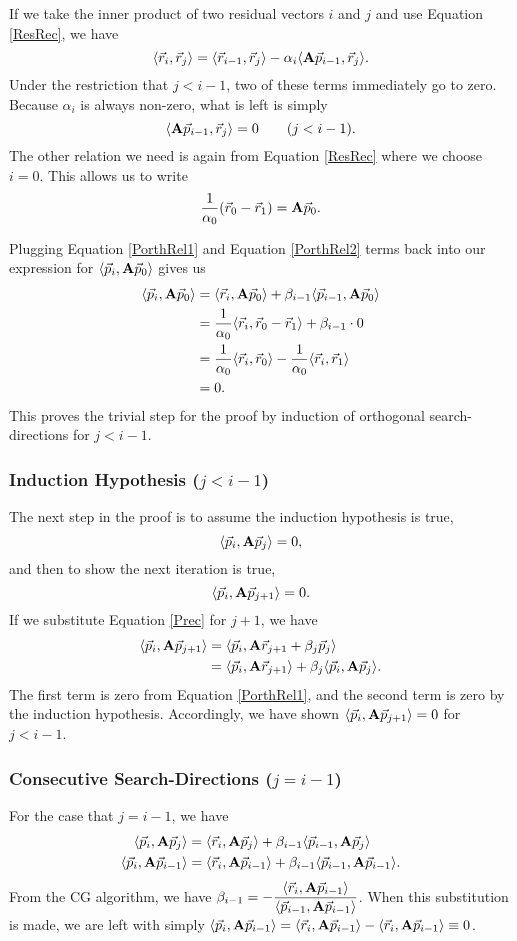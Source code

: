 \documentclass[11pt,letterpaper,oneside,notitlepage]{article}	%
\newcommand{\bfa}{{\bf A}}						%
\newcommand{\ip}[2]{\langle \vec #1,\vec #2 \rangle}	%
\newcommand{\aip}[2]{\langle \vec #1,\bfa\vec #2 \rangle}	%
\newcommand{\eq}[1]{Equation \eqref{#1}}		%
\newcommand{\pindent}[1]{\hspace{6mm}}  		%
\numberwithin{equation}{section}				%
\begin{document}
If we take the inner product of two residual vectors $i$ and $j$ and use \eq{ResRec}, we have 
\[
\ip{r_i}{r_j} = \ip{r_{i-1}}{r_j} -\alpha_i\langle\bfa\vec p_{i-1},\vec r_j\rangle
.\]
Under the restriction that $j<i-1$, two of these terms immediately go to zero. Because $\alpha_i$ is always non-zero, what is left is simply 
\begin{equation}
\langle\bfa\vec p_{i-1},\vec r_j\rangle=0 \qquad (j<i-1) \label{PorthRel1}
.\end{equation}
The other relation we need is again from \eq{ResRec} where we choose $i=0$. This allows us to write
\begin{equation}
\frac{1}{\alpha_0}(\vec r_0-\vec r_1) = \bfa \vec p_0 \label{PorthRel2}
.\end{equation}

Plugging \eq{PorthRel1} and \eq{PorthRel2} terms back into our expression for $\aip{p_i}{p_0}$ gives us
\begin{align*}
\aip{p_i}{p_0} &= \aip{r_i}{p_0} + \beta_{i-1}\aip{p_{i-1}}{p_0} \\
&= \frac{1}{\alpha_0}\ip{r_i}{r_0-\vec r_1} + \beta_{i-1}\cdot 0 \\
&= \frac{1}{\alpha_0}\ip{r_i}{r_0} - \frac{1}{\alpha_0}\ip{r_i}{r_1} \\
&= 0
.\end{align*}
This proves the trivial step for the proof by induction of orthogonal search-directions for $j<i-1$.

\subsubsection{Induction Hypothesis ($j<i-1$)}%
\pindent{}The next step in the proof is to assume the induction hypothesis is true,
\[
\aip{p_i}{p_j}=0
,\]
and then to show the next iteration is true,
\[
\aip{p_i}{p_{j+1}}=0
.\]
If we substitute \eq{Prec} for $j+1$, we have
\begin{align*}
\aip{p_i}{p_{j+1}} &= \aip{p_i}{r_{j+1}+\beta_j\vec p_j} \\
&= \aip{p_i}{r_{j+1}}+\beta_j\aip{p_i}{p_j}
.\end{align*}
The first term is zero from \eq{PorthRel1}, and the second term is zero by the induction hypothesis. Accordingly, we have shown $\aip{p_i}{p_{j+1}} = 0$ for $j<i-1$.

\subsubsection{Consecutive Search-Directions ($j=i-1$)}
\pindent{}For the case that $j=i-1$, we have
\begin{align*}
\aip{p_i}{p_j} &= \aip{r_i}{p_j} + \beta_{i-1}\aip{p_{i-1}}{p_j} \\
\aip{p_i}{p_{i-1}} &= \aip{r_i}{p_{i-1}} + \beta_{i-1}\aip{p_{i-1}}{p_{i-1}}
.\end{align*}
From the CG algorithm, we have $\beta_{i-1}=-\dfrac{\aip{r_i}{p_{i-1}}}{\aip{p_{i-1}}{p_{i-1}}}$. When this substitution is made, we are left with simply $\aip{p_i}{p_{i-1}} = \aip{r_i}{p_{i-1}}-\aip{r_i}{p_{i-1}}\equiv 0$.
\end{document}
